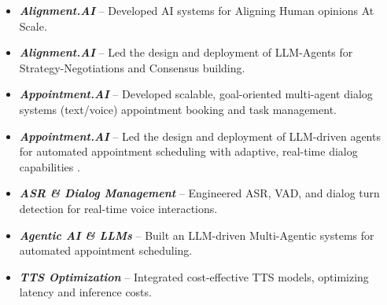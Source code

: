 \documentclass[11pt,a4paper,sans]{moderncv} %
\begin{document}
{\begin{itemize}[noitemsep]
    \item[\tiny $\bullet$] {\textbf{\textit{Alignment.AI}} – Developed AI systems for Aligning Human opinions At Scale.}
    \item[\tiny $\bullet$] {\textbf{\textit{Alignment.AI}} – Led the design and deployment of LLM-Agents for Strategy-Negotiations and Consensus building.}
\end{itemize}}





{\begin{itemize}[noitemsep]
    \item[\tiny $\bullet$] {\textbf{\textit{Appointment.AI}} – Developed scalable, goal-oriented multi-agent dialog systems (text/voice)  appointment booking and task management.}
    \item[\tiny $\bullet$] {\textbf{\textit{Appointment.AI}} –  Led the design and deployment of LLM-driven agents for automated appointment scheduling with adaptive, real-time dialog capabilities .}
    \item[\tiny$\bullet$]{\textbf{\textit{ASR \& Dialog Management}} – Engineered ASR, VAD, and dialog turn detection for real-time voice interactions.}
    \item[\tiny$\bullet$]{\textbf{\textit{Agentic AI \& LLMs}} – Built an LLM-driven Multi-Agentic systems for automated appointment scheduling.}
    \item[\tiny$\bullet$]{\textbf{\textit{TTS Optimization}} – Integrated cost-effective TTS models, optimizing latency and inference costs.}
\end{itemize}}
\end{document}
